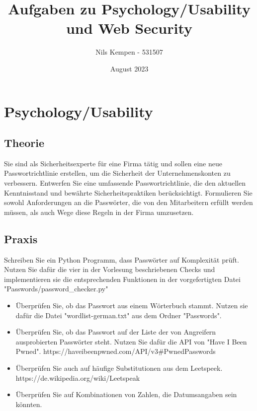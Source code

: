 \documentclass[ngerman]{article}
\title{Aufgaben zu Psychology/Usability und Web Security}
\author{Nils Kempen - 531507}
\date{August 2023}
\begin{document}
\maketitle


\section{Psychology/Usability}

\subsection{Theorie}
Sie sind als Sicherheitsexperte für eine Firma tätig und sollen eine neue Passwortrichtlinie erstellen, um die Sicherheit der Unternehmenskonten zu verbessern. Entwerfen Sie eine umfassende Passwortrichtlinie, die den aktuellen Kenntnisstand und bewährte Sicherheitspraktiken berücksichtigt.
Formulieren Sie sowohl Anforderungen an die Passwörter, die von den Mitarbeitern erfüllt werden müssen, als auch Wege diese Regeln in der Firma umzusetzen.

\subsection{Praxis}
Schreiben Sie ein Python Programm, dass Passwörter auf Komplexität prüft. Nutzen Sie dafür die vier in der Vorlesung beschriebenen Checks und implementieren sie die entsprechenden Funktionen in der vorgefertigten Datei "Passwords/password\_checker.py" 

\begin{itemize}
    \item Überprüfen Sie, ob das Passwort aus einem Wörterbuch stammt. Nutzen sie dafür die Datei "wordlist-german.txt" aus dem Ordner "Passwords".
    \item Überprüfen Sie, ob das Passwort auf der Liste der von Angreifern ausprobierten Passwörter steht. Nutzen Sie dafür die API von "Have I Been Pwned". https://haveibeenpwned.com/API/v3\#PwnedPasswords
    \item Überprüfen Sie auch auf häufige Substitutionen aus dem Leetspeek. https://de.wikipedia.org/wiki/Leetspeak
    \item Überprüfen Sie auf Kombinationen von Zahlen, die Datumsangaben sein könnten.
\end{itemize}
\end{document}

